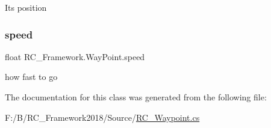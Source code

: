 Its position 

\mbox{\label{class_r_c___framework_1_1_way_point_afa805c2ea4ded188967af6e98d0e5f0c}} 
\subsubsection{\texorpdfstring{speed}{speed}}
{\footnotesize\ttfamily float R\+C\+\_\+\+Framework.\+Way\+Point.\+speed}



how fast to go 



The documentation for this class was generated from the following file\+:\begin{DoxyCompactItemize}
\item 
F\+:/\+B/\+R\+C\+\_\+\+Framework2018/\+Source/\mbox{\hyperlink{_r_c___waypoint_8cs}{R\+C\+\_\+\+Waypoint.\+cs}}\end{DoxyCompactItemize}
